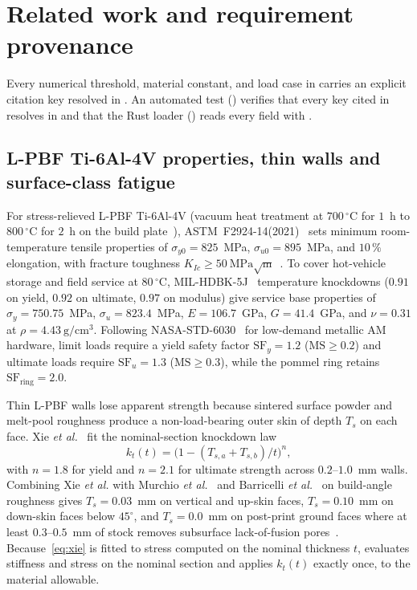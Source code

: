 \section{Related work and requirement provenance}\label{sec:related}
Every numerical threshold, material constant, and load case in 
carries an explicit citation key resolved in . An automated test
() verifies that every key cited in 
resolves in  and that the Rust loader ()
reads every field with .

\subsection{L-PBF Ti-6Al-4V properties, thin walls and surface-class fatigue}
For stress-relieved L-PBF Ti-6Al-4V (vacuum heat treatment at $700\,^\circ\mathrm{C}$ for $1$~h to $800\,^\circ\mathrm{C}$ for
$2$~h on the build plate~\cite{ncamp,eos,vrancken2012}), ASTM~F2924-14(2021)~\cite{f2924} sets minimum room-temperature
tensile properties of $\sigma_{y0} = 825$~MPa, $\sigma_{u0} = 895$~MPa, and $10\,\%$ elongation, with fracture toughness
$K_{Ic} \ge 50~\mathrm{MPa}\sqrt{\mathrm{m}}$~\cite{cain2015}. To cover hot-vehicle storage and field service at
$80\,^\circ\mathrm{C}$, MIL-HDBK-5J~\cite{hdbk5j} temperature knockdowns ($0.91$ on yield, $0.92$ on ultimate, $0.97$ on
modulus) give service base properties of $\sigma_y = 750.75$~MPa, $\sigma_u = 823.4$~MPa, $E = 106.7$~GPa, $G = 41.4$~GPa,
and $\nu = 0.31$ at $\rho = 4.43~\mathrm{g/cm^3}$. Following NASA-STD-6030~\cite{nasa6030} for low-demand metallic AM
hardware, limit loads require a yield safety factor $\mathrm{SF}_y = 1.2$ ($\mathrm{MS} \ge 0.2$) and ultimate loads require
$\mathrm{SF}_u = 1.3$ ($\mathrm{MS} \ge 0.3$), while the pommel ring retains $\mathrm{SF}_\mathrm{ring} = 2.0$.

Thin L-PBF walls lose apparent strength because sintered surface powder and melt-pool roughness produce a non-load-bearing
outer skin of depth $T_s$ on each face. Xie \emph{et al.}~\cite{xie2026} fit the nominal-section knockdown law
\begin{equation}\label{eq:xie}
k_t(t) = \bigl(1 - (T_{s,a} + T_{s,b})/t\bigr)^n,
\end{equation}
with $n = 1.8$ for yield and $n = 2.1$ for ultimate strength across $0.2$--$1.0$~mm walls. Combining Xie \emph{et al.} with
Murchio \emph{et al.}~\cite{murchio2024} and Barricelli \emph{et al.}~\cite{barricelli2022} on build-angle roughness gives
$T_s = 0.03$~mm on vertical and up-skin faces, $T_s = 0.10$~mm on down-skin faces below $45^\circ$, and $T_s = 0.0$~mm on
post-print ground faces where at least $0.3$--$0.5$~mm of stock removes subsurface lack-of-fusion pores~\cite{beretta2017,eos}.
Because~\eqref{eq:xie} is fitted to stress computed on the nominal thickness $t$, 
evaluates stiffness and stress on the nominal section and applies $k_t(t)$ exactly once, to the material allowable.

